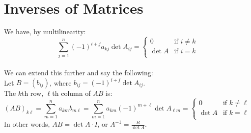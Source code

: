 \documentclass{article}
\theoremstyle{definition}
\begin{document}
\section{Inverses of Matrices}
We have, by multilinearity:
\begin{equation*}
	\sum_{j=1}^n(-1)^{i+j}a_{kj}\det A_{ij}=
	\begin{cases}
		0 & \text{if $i\neq k$} \\
		\det A & \text{if $i=k$} \\
	\end{cases}
\end{equation*}
\\
We can extend this further and say the following: \\
Let $B=(b_{ij})$, where $b_{ij}=(-1)^{i+j}\det A_{ij}$. \\
The $k$th row, $\ell$th column of $AB$ is:
\begin{equation*}
	(AB)_{k\ell}=\sum_{m=1}^na_{km}b_{m\ell}=\sum_{m=1}^na_{km}(-1)^{m+\ell}\det A_{\ell m}
	=\begin{cases}
		0 & \text{if $k\neq \ell$} \\
		\det A & \text{if $k=\ell$} \\
	\end{cases}
\end{equation*}
In other words, $AB=\det A \cdot I$, or $A^{-1}=\frac{B}{\det A}$.
\end{document}
